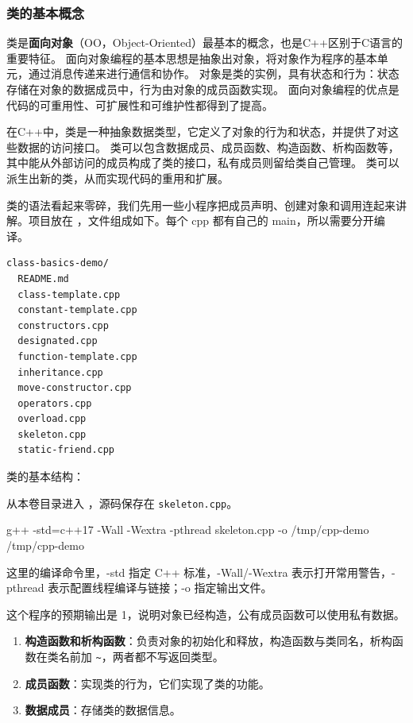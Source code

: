 \subsubsection{类的基本概念}

类是\textbf{面向对象}（OO，Object-Oriented）最基本的概念，也是C++区别于C语言的重要特征。
面向对象编程的基本思想是抽象出对象，将对象作为程序的基本单元，通过消息传递来进行通信和协作。
对象是类的实例，具有状态和行为：状态存储在对象的数据成员中，行为由对象的成员函数实现。
面向对象编程的优点是代码的可重用性、可扩展性和可维护性都得到了提高。

在C++中，类是一种抽象数据类型，它定义了对象的行为和状态，并提供了对这些数据的访问接口。
类可以包含数据成员、成员函数、构造函数、析构函数等，其中能从外部访问的成员构成了类的接口，私有成员则留给类自己管理。
类可以派生出新的类，从而实现代码的重用和扩展。

类的语法看起来零碎，我们先用一些小程序把成员声明、创建对象和调用连起来讲解。项目放在 ，文件组成如下。每个 cpp 都有自己的 main，所以需要分开编译。
\begin{lstlisting}[language={}]
class-basics-demo/
  README.md
  class-template.cpp
  constant-template.cpp
  constructors.cpp
  designated.cpp
  function-template.cpp
  inheritance.cpp
  move-constructor.cpp
  operators.cpp
  overload.cpp
  skeleton.cpp
  static-friend.cpp
\end{lstlisting}

\begin{example}
类的基本结构：


从本卷目录进入 ，源码保存在 \texttt{skeleton.cpp}。
\begin{tbash}
g++ -std=c++17 -Wall -Wextra -pthread skeleton.cpp -o /tmp/cpp-demo
/tmp/cpp-demo
\end{tbash}
这里的编译命令里，-std 指定 C++ 标准，-Wall/-Wextra 表示打开常用警告，-pthread 表示配置线程编译与链接；-o 指定输出文件。

这个程序的预期输出是 1，说明对象已经构造，公有成员函数可以使用私有数据。
\end{example}

\begin{enumerate}
    \item \textbf{构造函数和析构函数}：负责对象的初始化和释放，构造函数与类同名，析构函数在类名前加 \texttt{\textasciitilde}，两者都不写返回类型。
    \item \textbf{成员函数}：实现类的行为，它们实现了类的功能。
    \item \textbf{数据成员}：存储类的数据信息。
\end{enumerate}

